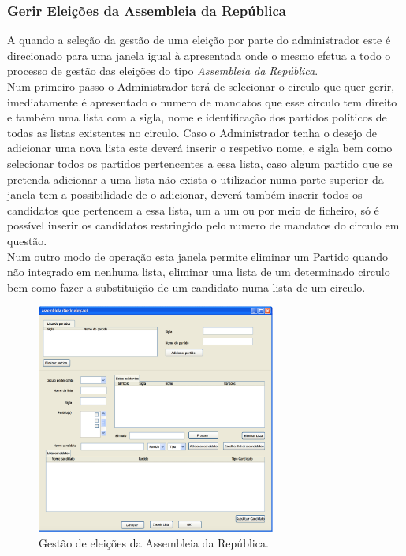 \documentclass[a4paper,12pt]{report}
\begin{document}
\subsubsection{Gerir Eleições da Assembleia da República}
A quando a seleção da gestão de uma eleição por parte do administrador este é direcionado para uma janela igual à apresentada onde o mesmo efetua a todo o processo de gestão das eleições do tipo \emph{Assembleia da República}.
\\\indent Num primeiro passo o Administrador terá de selecionar o circulo que quer gerir, imediatamente é apresentado o numero de mandatos que esse circulo tem direito e também uma lista com a sigla, nome e identificação dos partidos políticos de todas as listas existentes no circulo. Caso o Administrador tenha o desejo de adicionar uma nova lista este deverá inserir o respetivo nome, e sigla bem como selecionar todos os partidos pertencentes a essa lista, caso algum partido que se pretenda adicionar a uma lista não exista o utilizador numa parte superior da janela tem a possibilidade de o adicionar, deverá também inserir todos os candidatos que pertencem a essa lista, um a um ou por meio de ficheiro, só é possível inserir os candidatos restringido pelo numero de mandatos do circulo em questão.
\\\indent Num outro modo de operação esta janela permite eliminar um Partido quando não integrado em nenhuma lista, eliminar uma lista de um determinado circulo bem como fazer a substituição de um candidato numa lista de um circulo. 
\begin{figure}[h]
\begin{center}
	\includegraphics[width=0.7\textwidth]{media/mockup/GerirAR.png}
	 \caption{Gestão de eleições da Assembleia da República.}
\end{center}
\end{figure}
\newpage
\end{document}
